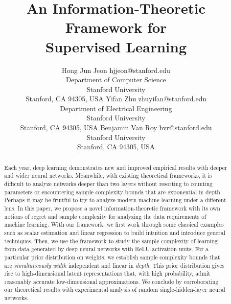 \documentclass[twoside,11pt]{article}
\begin{document}
\title{An Information-Theoretic Framework for\\ Supervised Learning}

\author{\name Hong Jun Jeon \email hjjeon@stanford.edu \\
       \addr Department of Computer Science\\
       Stanford University\\
       Stanford, CA 94305, USA
       \AND
        \name Yifan Zhu \email zhuyifan@stanford.edu \\
        \addr Department of Electrical Engineering\\
        Stanford University\\
        Stanford, CA 94305, USA
       \AND
       \name Benjamin Van Roy \email bvr@stanford.edu \\
       \addr 
       Stanford University\\
       Stanford, CA 94305, USA}
\editor{}

\maketitle

\begin{abstract}%
Each year, deep learning demonstrates new and improved empirical results with deeper and wider neural networks. Meanwhile, with existing theoretical frameworks, it is difficult to analyze networks deeper than two layers without resorting to counting parameters or encountering sample complexity bounds that are exponential in depth. Perhaps it may be fruitful to try to analyze modern machine learning under a different lens. In this paper, we propose a novel information-theoretic framework with its own notions of regret and sample complexity for analyzing the data requirements of machine learning. With our framework, we first work through some classical examples such as scalar estimation and linear regression to build intuition and introduce general techniques. Then, we use the framework to study the sample complexity of learning from data generated by deep neural networks with ReLU activation units. For a particular prior distribution on weights, we establish sample complexity bounds that are \emph{simultaneously} \emph{width} independent and linear in \emph{depth}.  This prior distribution gives rise to high-dimensional latent representations that, with high probability, admit reasonably accurate low-dimensional approximations.  We conclude by corroborating our theoretical results with experimental analysis of random single-hidden-layer neural networks.
\end{abstract}
\end{document}
